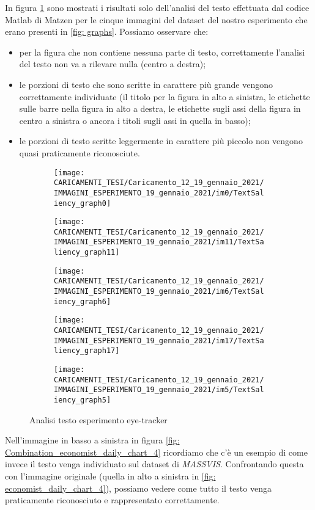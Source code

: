 \documentclass[%
	corpo=12pt,
    twoside,
    stile=classica,
    oldstyle,
    tipotesi=custom,
    greek,
    evenboxes,
]{toptesi}
\begin{document}
{In figura \ref{fig: TextSaliency_graphs} sono mostrati i risultati solo dell'analisi del testo effettuata dal codice Matlab di Matzen per le cinque immagini del dataset del nostro esperimento che erano presenti in \ref{fig: graphs}. Possiamo osservare che:
\begin{itemize}
\item per la figura che non contiene nessuna parte di testo, correttamente l'analisi del testo non va a rilevare nulla (centro a destra);
\item le porzioni di testo che sono scritte in carattere più grande vengono correttamente individuate (il titolo per la figura in alto a sinistra, le etichette sulle barre nella figura in alto a destra, le etichette sugli assi della figura in centro a sinistra o ancora i titoli sugli assi in quella in basso);
\item le porzioni di testo scritte leggermente in carattere più piccolo non vengono quasi praticamente riconosciute.
\end{itemize}
\begin{figure}[!htb]\centering
\begin{subfigure}
\centering
\texttt{[image: CARICAMENTI\_TESI/Caricamento\_12\_19\_gennaio\_2021/IMMAGINI\_ESPERIMENTO\_19\_gennaio\_2021/im0/TextSaliency\_graph0]}
\end{subfigure}
\begin{subfigure}
\centering
\texttt{[image: CARICAMENTI\_TESI/Caricamento\_12\_19\_gennaio\_2021/IMMAGINI\_ESPERIMENTO\_19\_gennaio\_2021/im11/TextSaliency\_graph11]}
\end{subfigure}
\begin{subfigure}
\centering
\texttt{[image: CARICAMENTI\_TESI/Caricamento\_12\_19\_gennaio\_2021/IMMAGINI\_ESPERIMENTO\_19\_gennaio\_2021/im6/TextSaliency\_graph6]}
\end{subfigure}
\begin{subfigure}
\centering
\texttt{[image: CARICAMENTI\_TESI/Caricamento\_12\_19\_gennaio\_2021/IMMAGINI\_ESPERIMENTO\_19\_gennaio\_2021/im17/TextSaliency\_graph17]}
\end{subfigure}
\begin{subfigure}
\centering
\texttt{[image: CARICAMENTI\_TESI/Caricamento\_12\_19\_gennaio\_2021/IMMAGINI\_ESPERIMENTO\_19\_gennaio\_2021/im5/TextSaliency\_graph5]}
\end{subfigure}
\caption{Analisi testo esperimento eye-tracker}\label{fig: TextSaliency_graphs}
\end{figure}
Nell'immagine in basso a sinistra in figura \ref{fig: Combination_economist_daily_chart_4} ricordiamo che c'è un esempio di come invece il testo venga individuato sul dataset di \textit{MASSVIS}. Confrontando questa con l'immagine originale (quella in alto a sinistra in \ref{fig: economist_daily_chart_4}), possiamo vedere come tutto il testo venga praticamente riconosciuto e rappresentato correttamente. 



}
\end{document}
